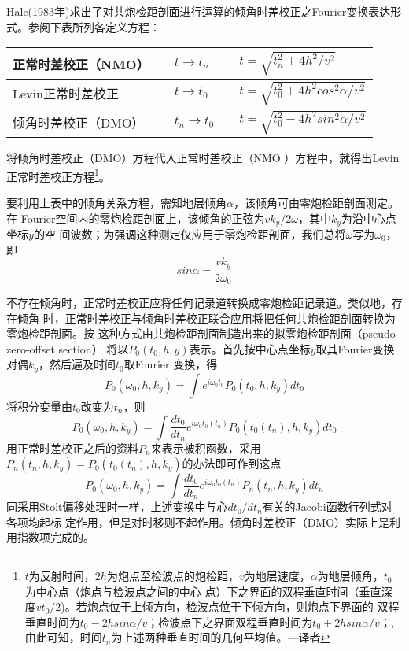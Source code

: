 Hale(1983年)求出了对共炮检距剖面进行运算的倾角时差校正之Fourier变换表达形
式。参阅下表所列各定义方程：
\begin{table}[!ht]
\centering
\ttfamily
\small
\begin{tabularx}{\textwidth}{|Y|Y|Y|}
\hline
正常时差校正（NMO）&& $t\rightarrow t_n$ && $t=\sqrt{t_n^2+4h^2/v^2}$\\
\hline
Levin正常时差校正&& $t\rightarrow t_0$ && $t=\sqrt{t_0^2+4h^2cos^2\alpha/v^2}$\\
\hline
倾角时差校正（DMO）&& $t_n\rightarrow t_0$ && $t=\sqrt{t_0^2-4h^2sin^2\alpha/v^2}$\\
\hline
\end{tabularx}
\end{table}
将倾角时差校正（DMO）方程代入正常时差校正（NMO
）方程中，就得出Levin正常时差校正方程\footnote{
$t$为反射时间，$2h$为炮点至检波点的炮检距，$v$为地层速度，$\alpha$为地层倾角，$t_0$为中心点（炮点与检波点之间的中心
点）下之界面的双程垂直时间（垂直深度$vt_0/2$)。若炮点位于上倾方向，检波点位于下倾方向，则炮点下界面的
双程垂直时间为$t_0-2hsin\alpha/v$；检波点下之界面双程垂直时间为$t_0+2hsin\alpha/v$；,由此可知，时间$t_n$为上述两种垂直时间的几何平均值。---译者
}。

要利用上表中的倾角关系方程，需知地层倾角$\alpha$，该倾角可由零炮检距剖面测定。在
Fourier空间内的零炮检距剖面上，该倾角的正弦为$vk_y/2\omega$，其中$k_y$为沿中心点坐标$y$的空
间波数；为强调这种测定仅应用于零炮检距剖面，我们总将$\omega$写为$\omega_0$，即
\begin{equation}
sin\alpha = \frac{vk_y}{2\omega_0}
\label{eq:ex3.6.3}
\end{equation}

不存在倾角时，正常时差校正应将任何记录道转换成零炮检距记录道。类似地，存在倾角
时，正常时差校正与倾角时差校正联合应用将把任何共炮检距剖面转换为零炮检距剖面。按
这种方式由共炮检距剖面制造出来的拟零炮检距剖面（pseudo-zero-offset section）
将以$P_0(t_0,h,y)$表示。首先按中心点坐标$y$取其Fourier变换对偶$k_y$，然后遍及时间$t_0$取Four­ier
变换，得
\begin{equation}
P_0(\omega_0,h,k_y)=\int e^{i\omega_0t_0}P_0(t_0,h,k_y)dt_0
\label{eq:ex3.6.4}
\end{equation}
将积分变量由$t_0$改变为$t_n$，则
\begin{equation}
P_0(\omega_0,h,k_y)=\int \frac{dt_0}{dt_n}e^{i\omega_0t_0(t_n)}P_0(t_0(t_n),h,k_y)dt_0
\label{eq:ex3.6.5}
\end{equation}
用正常时差校正之后的资料$P_n$来表示被积函数，采用$P_n(t_n,h,k_y)=P_0(t_0(t_n),h,k_y)$的办法即可作到这点
\begin{equation}
P_0(\omega_0,h,k_y)=\int \frac{dt_0}{dt_n}e^{i\omega_0t_0(t_n)}P_n(t_n,h,k_y)dt_n
\label{eq:ex3.6.6}
\end{equation}
同采用Stolt偏移处理时一样，上述变换中与心$dt_0/dt_n$有关的Jacobi函数行列式对各项均起标
定作用，但是对时移则不起作用。倾角时差校正（DMO）实际上是利用指数项完成的。

